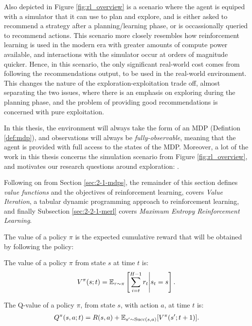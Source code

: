     Also depicted in Figure \ref{fig:rl_overview} is a scenario where the agent is equiped with a simulator that it can use to plan and explore, and is either asked to recommend a strategy after a planning/learning phase, or is occassionally queried to recommend actions. This scenario more closely resembles how reinforcement learning is used in the modern era with greater amounts of compute power available, and interactions with the simulator occur at orders of magnitude quicker. Hence, in this scenario, the only significant real-world cost comes from following the recommendations output, to be used in the real-world environment. This changes the nature of the exploration-exploitation trade off, almost separating the two issues, where there is an emphasis on exploring during the planning phase, and the problem of providing good recommendations is concerned with pure exploitation. 

    In this thesis, the environment will always take the form of an MDP (Defintion \ref{def:mdp}), and observations will always be \textit{fully-observable}, meaning that the agent is provided with full access to the states of the MDP. Moreover, a lot of the work in this thesis concerns the simulation scenario from Figure \ref{fig:rl_overview}, and motivates our research questions around exploration: \exploreq.

    Following on from Section \ref{sec:2-1-mdps}, the remainder of this section defines \textit{value functions} and the objectives of reinforcement learning, covers \textit{Value Iteration}, a tabular dynamic programming approach to reinforcement learning, and finally Subsection \ref{sec:2-2-1-merl} covers \textit{Maximum Entropy Reinforcement Learning}.
    
    The value of a policy $\pi$ is the expected cumulative reward that will be obtained by following the policy:
    \begin{defn}
        \label{def:value}
        \label{def:q_value}
        The \textnormal{value} of a policy $\pi$ from state $s$ at time $t$ is:
        \begin{align}
            V^{\pi}(s;t) = \mathbb{E}_{\tau\sim\pi}\left[\sum_{i=t}^{H-1} r_t \Bigg| s_t=s \right]. \label{eq:value_fn_def}
        \end{align} 

        The \textnormal{Q-value} of a policy $\pi$, from state $s$, with action $a$, at time $t$ is:
        \begin{align}
            Q^{\pi}(s,a;t) = R(s,a) + \mathbb{E}_{s'\sim {\textnormal{Succ}(s,a)}} [V^{\pi}(s';t+1)]. \label{eq:q_value_fn_def}
        \end{align} 
    \end{defn}

